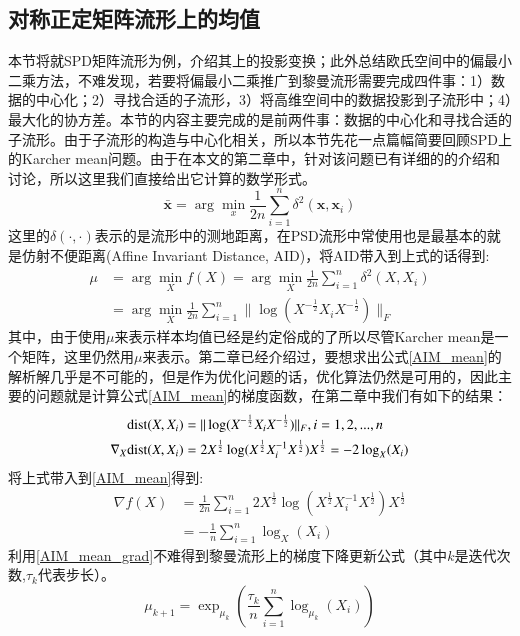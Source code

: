 \subsection{对称正定矩阵流形上的均值}
\label{sec:riemannian_mean}
本节将就SPD矩阵流形为例，介绍其上的投影变换；此外总结欧氏空间中的偏最小二乘方法，不难发现，若要将偏最小二乘推广到黎曼流形需要完成四件事：1）数据的中心化；2）寻找合适的子流形，3）将高维空间中的数据投影到子流形中；4）最大化的协方差。本节的内容主要完成的是前两件事：数据的中心化和寻找合适的子流形。由于子流形的构造与中心化相关，所以本节先花一点篇幅简要回顾SPD上的Karcher mean问题。由于在本文的第二章中，针对该问题已有详细的的介绍和讨论，所以这里我们直接给出它计算的数学形式。
\begin{displaymath}
\bar{\bm{x}}=\arg\min_x\frac{1}{2n}\sum_{i=1}^{n}\delta^{2}(\bm{x},\bm{x}_i)
\end{displaymath}
这里的$\delta(\cdot,\cdot)$表示的是流形中的测地距离，在PSD流形中常使用也是最基本的就是仿射不便距离(Affine Invariant Distance, AID\cite{AIM_metric})，将AID带入到上式的话得到:
\begin{equation}
\label{AIM_mean}
\begin{split}
\mu&=\arg\min_{X}f(X)=\arg\min_{X}\frac{1}{2n}\sum_{i=1}^{n}\delta^{2}(X,X_i)\\
&=\arg\min_{X}\frac{1}{2n}\sum_{i=1}^{n}\|\log(X^{-\frac{1}{2}}X_iX^{-\frac{1}{2}})\|_F
\end{split}
\end{equation}
其中，由于使用$\mu$来表示样本均值已经是约定俗成的了所以尽管Karcher mean是一个矩阵，这里仍然用$\mu$来表示。第二章已经介绍过，要想求出公式\ref{AIM_mean}的解析解几乎是不可能的，但是作为优化问题的话，优化算法仍然是可用的，因此主要的问题就是计算公式\ref{AIM_mean}的梯度函数，在第二章中我们有如下的结果：
\begin{equation}
\label{AIM_grad}
\begin{split}
{\rm dist}(X,X_i)&=\|\log(X^{-\frac{1}{2}} X_i X^{-\frac{1}{2}})\|_{F},i=1,2,...,n\\
\nabla_X {\rm dist}(X,X_i)&=2X^{\frac{1}{2}}\log(X^{\frac{1}{2}}X_{i}^{-1}X^{\frac{1}{2}})X^{\frac{1}{2}}=-2\log_{X}(X_i)
\end{split}
\end{equation}
将上式带入到\ref{AIM_mean}得到:
\begin{equation}
\label{AIM_mean_grad}
\begin{split}
\nabla f(X)&=\frac{1}{2n}\sum_{i=1}^{n}2X^{\frac{1}{2}}\log(X^{\frac{1}{2}}X_{i}^{-1}X^{\frac{1}{2}})X^{\frac{1}{2}}\\
&=-\frac{1}{n}\sum_{i=1}^{n}\log_{X}(X_i)
\end{split}
\end{equation}
利用\ref{AIM_mean_grad}不难得到黎曼流形上的梯度下降更新公式（其中$k$是迭代次数,$\tau_k$代表步长）。
\begin{equation}
\label{AIM_grad_update}
\mu_{k+1}=\exp_{\mu_k}(\frac{\tau_k}{n}\sum_{i=1}^{n}\log_{\mu_k}(X_i))
\end{equation}
